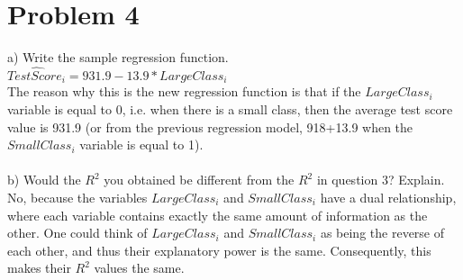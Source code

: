 \documentclass[11pt, oneside]{article}   	%
\begin{document}
\section{Problem 4}
a) Write the sample regression function.\\
$\widehat{TestScore_i} = 931.9 - 13.9 * LargeClass_i$\\
The reason why this is the new regression function is that if the $LargeClass_i$ variable is equal to 0, i.e. when there is a small class, then the average test score value is 931.9 (or from the previous regression model, 918+13.9 when the $SmallClass_i$ variable is equal to 1). \\~\\
b) Would the $R^2$ you obtained be different from the $R^2$ in question 3? Explain.\\
No, because the variables $LargeClass_i$ and $SmallClass_i$ have a dual relationship, where each variable contains exactly the same amount of information as the other. One could think of $LargeClass_i$ and $SmallClass_i$ as being the reverse of each other, and thus their explanatory power is the same. Consequently, this makes their $R^2$ values the same.
\end{document}
